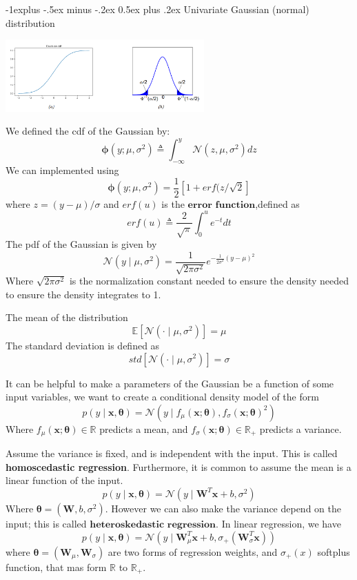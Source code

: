 \documentclass[10pt,landscape]{article}
\makeatletter
\newcommand{\mean}{\mathbb{E}}
\newcommand{\inp}{\textbf{x}}
\newcommand{\parameter}{\boldsymbol{\theta}}
\newcommand{\R}{\mathbb{R}}
\newcommand{\variance}{\sigma^2}
\newcommand{\normal}{\mathcal{N}}
\newcommand{\weight}{\mathbf{W}}
\newcommand{\softplus}[1]{\sigma_+(#1)}
\renewcommand{\subsection}{\@startsection{subsection}{2}{0mm}%
                                {-1explus -.5ex minus -.2ex}%
                                {0.5ex plus .2ex}%
                                {\normalfont\normalsize\bfseries}}
\makeatother
\begin{document}
\begin{multicols*}{3}
\subsection{Univariate Gaussian (normal) distribution}
 \begin{minipage}{\linewidth}
    \centering
    \includegraphics[width=3in]{figures/gauss_plot.PNG}
\end{minipage}
We defined the cdf of the Gaussian by:
\[
    \boldsymbol{\phi}(y;\mu,\variance)\triangleq\int_{-\infty}^{y}\normal(z,\mu,\variance)dz
\]
We can implemented using 
\[
    \boldsymbol{\phi}(y;\mu,\variance)=\frac{1}{2}[1+erf(z/\sqrt{2}]
\]
where $z=(y-\mu)/\sigma$ and $erf(u)$ is the $\textbf{error function}$,defined as
\[
    erf(u)\triangleq\frac{2}{\sqrt{\pi}}\int_{0}^{u}e^{-t}dt
\]
The pdf of the Gaussian is given by
\[
    \normal(y\mid\mu,\variance)=\frac{1}{\sqrt{2\pi\variance}}e^{-\frac{{1}}{2\variance}(y-\mu)^2}
\]
Where $\sqrt{2\pi\variance}$ is the normalization constant needed to ensure the density needed to ensure the density integrates to 1.

The mean of the distribution
\[\mean[\normal(\cdot\mid\mu,\variance)]=\mu\]
The standard deviation is defined as
\[std[\normal(\cdot\mid\mu,\variance)]=\sigma\]

It can be helpful to make a parameters of the Gaussian be a function of some input variables, we want to create a conditional density model of the form
\[
    p(y\mid\inp,\parameter)=\normal(y\mid f_{\mu}(\inp;\parameter),f_{\sigma}(\inp;\parameter)^2)
\]
Where $f_{\mu}(\inp;\parameter)\in\R$ predicts a mean, and $f_{\sigma}(\inp;\parameter)\in\R_+$ predicts a variance.

Assume the variance is fixed, and is independent with the input. This is called \textbf{homoscedastic regression}. Furthermore, it is common to assume the mean is a linear function of the input.
\[
    p(y\mid\inp,\parameter)=\normal(y\mid \weight^T\inp+b,\variance)
\]
Where $\parameter=(\weight,b,\variance)$. However we can also make the variance depend on the input; this is called $\textbf{heteroskedastic regression}$. In linear regression, we have
\[
    p(y\mid\inp,\parameter)=\normal(y\mid \weight_{\mu}^T\inp+b,\sigma_+(\weight_\sigma^T\inp))
\]
where $\parameter=(\weight_{\mu},\weight_\sigma)$ are two forms of regression weights, and $\softplus{x}$ softplus function, that mas form $\R$ to $\R_+$.


\end{multicols*}
\end{document}
